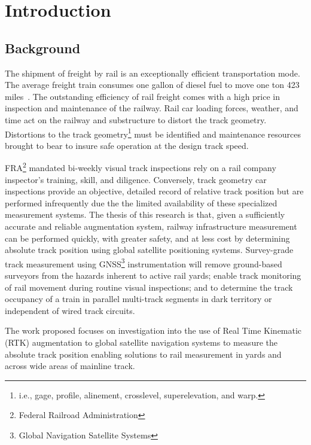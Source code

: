\chapter{Introduction}
\section{Background}
The shipment of freight by rail is an exceptionally efficient transportation mode. The average freight train consumes one gallon of diesel fuel to move one ton 423 miles~\citep{RITAtransStats08}. The outstanding efficiency of rail freight comes with a high price in inspection and maintenance of the railway. Rail car loading forces, weather, and time act on the railway and substructure to distort the track geometry. Distortions to the track geometry\footnote{i.e., gage, profile, alinement, crosslevel, superelevation, and warp.} must be identified and maintenance resources brought to bear to insure safe operation at the design track speed. 

FRA\footnote{Federal Railroad Administration} mandated bi-weekly visual track inspections rely on a rail company inspector's training, skill, and diligence. Conversely, track geometry car inspections provide an objective, detailed record of relative track position but are performed infrequently due the the limited availability of these specialized measurement systems. The thesis of this research is that, given a sufficiently accurate and reliable augmentation system, railway infrastructure measurement can be performed quickly, with greater safety, and at less cost by determining absolute track position using global satellite positioning systems. Survey-grade track measurement using GNSS\footnote{Global Navigation Satellite Systems} instrumentation will remove ground-based surveyors from the hazards inherent to active rail yards; enable track monitoring of rail movement during routine visual inspections; and to determine the track occupancy of a train in parallel multi-track segments in dark territory or independent of wired track circuits.

The work proposed focuses on investigation into the use of Real Time Kinematic (RTK) augmentation to global satellite navigation systems to measure the absolute track position enabling solutions to rail measurement in yards and across wide areas of mainline track.

